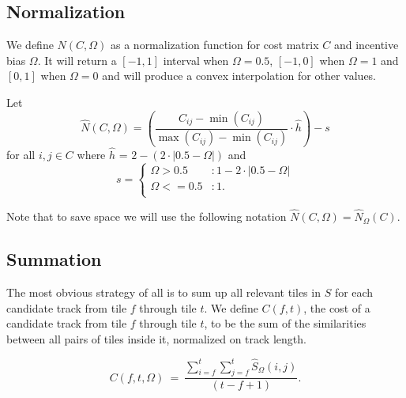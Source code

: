 \documentclass[twocolumn]{article}
\begin{document}
	\subsection{Normalization}
	
	We define $N(C,\Omega)$ as a normalization function for cost matrix $C$ and incentive bias $\Omega$. It will return a $[-1,1]$ interval when $\Omega=0.5$, $[-1,0]$ when $\Omega=1$  and $[0, 1]$ when $\Omega=0$ and will produce a convex interpolation for other values.
	
	Let 
	\begin{dmath*}
		\hat N(C,\Omega) = \left( \frac{ C_{ij} - \min \left( C_{ij} \right) }{ \max \left( C_{ij} \right) - \min \left( C_{ij} \right) } \cdot \hat h  \right)-s
	\end{dmath*}
	for all $i,j \in C$ where $\hat h$ = $2-\left( 2\cdot|0.5-\Omega| \right)$ and 
	\begin{dmath*}
		s= { \left\{
			\begin{array}{ll}
				\Omega > 0.5  & :   1-2 \cdot |0.5-\Omega|  \\
				\Omega <= 0.5 & : 1.  \\
			\end{array}
			\right.}
	\end{dmath*}
	
	Note that to save space we will use the following notation $\hat N(C, \Omega)=\hat N_\Omega(C)$.
	
	\subsection{Summation}
	
	The most obvious strategy of all is to sum up all relevant tiles in $S$ for each candidate track from tile $f$ through tile $t$. We define $C(f,t)$, the cost of a candidate track from tile $f$ through tile $t$, to be the sum of the similarities between all pairs of tiles inside it, normalized on track length.
	
	\begin{dmath*}
		C(f,t, \Omega) ~=~ \frac{ \sum_{i=f}^{t} \sum_{j=f}^{t} \hat S_\Omega(i,j) }{ (t-f+1) }.
	\end{dmath*}
	
\end{document}
